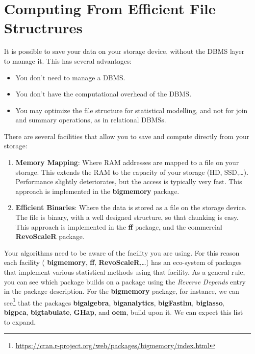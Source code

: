 \documentclass[]{book}
\providecommand{\tightlist}{%
  \setlength{\itemsep}{0pt}\setlength{\parskip}{0pt}}
\renewcommand{\href}[2]{#2\footnote{\url{#1}}}
\theoremstyle{definition}
\theoremstyle{definition}
\theoremstyle{definition}
\theoremstyle{remark}
\begin{document}
\hypertarget{file-structure}{%
\section{Computing From Efficient File Structrures}\label{file-structure}}

It is possible to save your data on your storage device, without the DBMS layer to manage it.
This has several advantages:

\begin{itemize}
\tightlist
\item
  You don't need to manage a DBMS.
\item
  You don't have the computational overhead of the DBMS.
\item
  You may optimize the file structure for statistical modelling, and not for join and summary operations, as in relational DBMSs.
\end{itemize}

There are several facilities that allow you to save and compute directly from your storage:

\begin{enumerate}
\def\labelenumi{\arabic{enumi}.}
\item
  \textbf{Memory Mapping}:
  Where RAM addresses are mapped to a file on your storage.
  This extends the RAM to the capacity of your storage (HD, SSD,\ldots{}).
  Performance slightly deteriorates, but the access is typically very fast.
  This approach is implemented in the \textbf{bigmemory} package.
\item
  \textbf{Efficient Binaries}:
  Where the data is stored as a file on the storage device.
  The file is binary, with a well designed structure, so that chunking is easy.
  This approach is implemented in the \textbf{ff} package, and the commercial \textbf{RevoScaleR} package.
\end{enumerate}

Your algorithms need to be aware of the facility you are using.
For this reason each facility ( \textbf{bigmemory}, \textbf{ff}, \textbf{RevoScaleR},\ldots{}) has an eco-system of packages that implement various statistical methods using that facility.
As a general rule, you can see which package builds on a package using the \emph{Reverse Depends} entry in the package description.
For the \textbf{bigmemory} package, for instance, \href{https://cran.r-project.org/web/packages/bigmemory/index.html}{we can see} that the packages \textbf{bigalgebra}, \textbf{biganalytics}, \textbf{bigFastlm}, \textbf{biglasso}, \textbf{bigpca}, \textbf{bigtabulate}, \textbf{GHap}, and \textbf{oem}, build upon it.
We can expect this list to expand.
\end{document}

